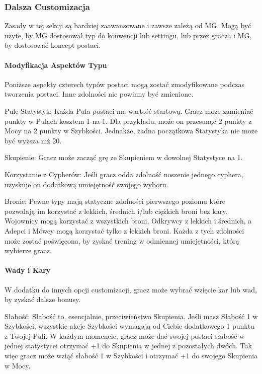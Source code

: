 \subsubsection{Dalsza Customizacja}

Zasady w tej sekcji są bardziej zaawansowane i zawsze zależą od MG. Mogą być użyte, by MG dostosował typ do konwencji lub settingu, lub przez gracza i MG, by dostosować koncept postaci.

\paragraph{Modyfikacja Aspektów Typu}

Poniższe aspekty czterech typów postaci mogą zostać zmodyfikowane podczas tworzenia postaci. Inne zdolności nie powinny być zmienione.

Pule Statystyk: Każda Pula postaci ma wartość startową. Gracz może zamieniać punkty w Pulach kosztem 1-na-1. Dla przykładu, może on przesunąć 2 punkty z Mocy na 2 punkty w Szybkości. Jednakże, żadna początkowa Statystyka nie może być wyższa niż 20.

Skupienie: Gracz może zacząć grę ze Skupieniem w dowolnej Statystyce na 1.

Korzystanie z Cypherów: Jeśli gracz odda zdolność noszenie jednego cyphera, uzyskuje on dodatkową umiejętność swojego wyboru.

Bronie: Pewne typy mają statyczne zdolności pierwszego poziomu które pozwalają im korzystać z lekkich, średnich i/lub ciężkich broni bez kary. Wojownicy mogą korzystać z wszystkich broni, Odkrywcy z lekkich i średnich, a Adepci i Mówcy mogą korzystać tylko z lekkich broni. Każda z tych zdolności może zostać poświęcona, by zyskać trening w odmiennej umiejętności, którą wybierze gracz.

\paragraph{Wady i Kary}

W dodatku do innych opcji customizacji, gracz może wybrać wzięcie kar lub wad, by zyskać dalsze bonusy.

Słabość: Słabość to, esencjalnie, przeciwieństwo Skupienia. Jeśli masz Słabość 1 w Szybkości, wszystkie akcje Szybkości wymagają od Ciebie dodatkowego 1 punktu z Twojej Puli. W każdym momencie, gracz może dać swojej postaci słabość w jednej statystycei otrzymać +1 do Skupienia w jednej z pozostałych dwóch. Tak więc gracz może wziąć słabość 1 w Szybkości i otrzymać +1 do swojego Skupienia w Mocy.

